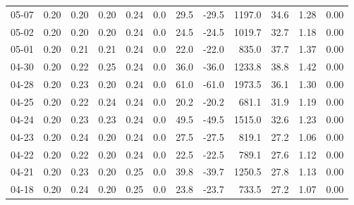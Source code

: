 \begin{threeparttable}
{\begin{tabular}{lrrrrrrrrrrr}
  05-07 &          0.20 &          0.20 &          0.20 &        0.24 &                 0.0 &                29.5 &      -29.5 &              1197.0 &             34.6 &            1.28 &                   0.00 \\
  05-02 &          0.20 &          0.20 &          0.20 &        0.24 &                 0.0 &                24.5 &      -24.5 &              1019.7 &             32.7 &            1.18 &                   0.00 \\
  05-01 &          0.20 &          0.21 &          0.21 &        0.24 &                 0.0 &                22.0 &      -22.0 &               835.0 &             37.7 &            1.37 &                   0.00 \\
  04-30 &          0.20 &          0.22 &          0.25 &        0.24 &                 0.0 &                36.0 &      -36.0 &              1233.8 &             38.8 &            1.42 &                   0.00 \\
  04-28 &          0.20 &          0.23 &          0.20 &        0.24 &                 0.0 &                61.0 &      -61.0 &              1973.5 &             36.1 &            1.30 &                   0.00 \\
  04-25 &          0.20 &          0.22 &          0.24 &        0.24 &                 0.0 &                20.2 &      -20.2 &               681.1 &             31.9 &            1.19 &                   0.00 \\
  04-24 &          0.20 &          0.23 &          0.23 &        0.24 &                 0.0 &                49.5 &      -49.5 &              1515.0 &             32.6 &            1.23 &                   0.00 \\
  04-23 &          0.20 &          0.24 &          0.20 &        0.24 &                 0.0 &                27.5 &      -27.5 &               819.1 &             27.2 &            1.06 &                   0.00 \\
  04-22 &          0.20 &          0.22 &          0.20 &        0.24 &                 0.0 &                22.5 &      -22.5 &               789.1 &             27.6 &            1.12 &                   0.00 \\
  04-21 &          0.20 &          0.23 &          0.20 &        0.25 &                 0.0 &                39.8 &      -39.7 &              1250.5 &             27.8 &            1.13 &                   0.00 \\
  04-18 &          0.20 &          0.24 &          0.20 &        0.25 &                 0.0 &                23.8 &      -23.7 &               733.5 &             27.2 &            1.07 &                   0.00 \\

\end{tabular}}
\end{threeparttable}
